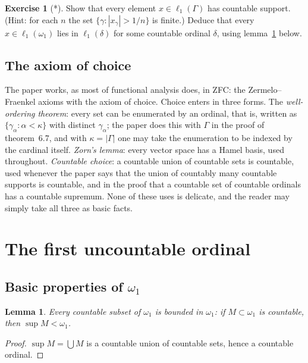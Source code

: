 \documentclass[12pt]{article}
\newtheorem{lemma}[theorem]{Lemma}
\theoremstyle{definition}
\newtheorem{exercise}[theorem]{Exercise}
\theoremstyle{remark}
\newcommand{\ellone}[1]{\ell_1(#1)}
\begin{document}
\begin{exercise}[*] Show that every element $x\in\ellone{\Gamma}$ has countable
    support. (Hint: for each $n$ the set $\{\gamma:|x_\gamma|>1/n\}$ is
    finite.) Deduce that every $x\in\ellone{\omega_1}$ lies in $\ellone{\delta}$
    for some countable ordinal $\delta$, using lemma~\ref{BoundedSubsets}
    below.
\end{exercise}

\subsection{The axiom of choice}\label{SecChoice}

The paper works, as most of functional analysis does, in ZFC: the
Zermelo--Fraenkel axioms with the axiom of choice. Choice enters in three
forms. The \emph{well-ordering theorem}: every set can be enumerated by an
ordinal, that is, written as $\{\gamma_\alpha:\alpha<\kappa\}$ with distinct
$\gamma_\alpha$; the paper does this with $\Gamma$ in the proof of
theorem~6.7, and with $\kappa=|\Gamma|$ one may take the enumeration to be
indexed by the cardinal itself. \emph{Zorn's lemma}: every vector space has a
Hamel basis, used throughout. \emph{Countable choice}: a countable union of
countable sets is countable, used whenever the paper says that the union of
countably many countable supports is countable, and in the proof that a
countable set of countable ordinals has a countable supremum. None of these
uses is delicate, and the reader may simply take all three as basic facts.

\section{The first uncountable ordinal}\label{SecOmegaOne}

\subsection{Basic properties of $\omega_1$}

\begin{lemma}\label{BoundedSubsets} Every countable subset of $\omega_1$ is
    bounded in $\omega_1$: if $M\subset\omega_1$ is countable, then
    $\sup M<\omega_1$.
\end{lemma}
\begin{proof} $\sup M=\bigcup M$ is a countable union of countable sets, hence
    a countable ordinal.
\end{proof}
\end{document}
